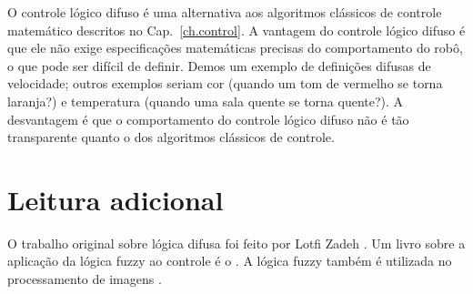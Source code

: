 O controle lógico difuso é uma alternativa aos algoritmos clássicos de controle matemático descritos no Cap.~\ref{ch.control}. A vantagem do controle lógico difuso é que ele não exige especificações matemáticas precisas do comportamento do robô, o que pode ser difícil de definir. Demos um exemplo de definições difusas de velocidade; outros exemplos seriam cor (quando um tom de vermelho se torna laranja?) e temperatura (quando uma sala quente se torna quente?). A desvantagem é que o comportamento do controle lógico difuso não é tão transparente quanto o dos algoritmos clássicos de controle.

\section{Leitura adicional}

O trabalho original sobre lógica difusa foi feito por Lotfi Zadeh \cite{zadeh}. Um livro sobre a aplicação da lógica fuzzy ao controle é o \cite{Passino}.  A lógica fuzzy também é utilizada no processamento de imagens \cite[Sect.~3.8]{GW}.

